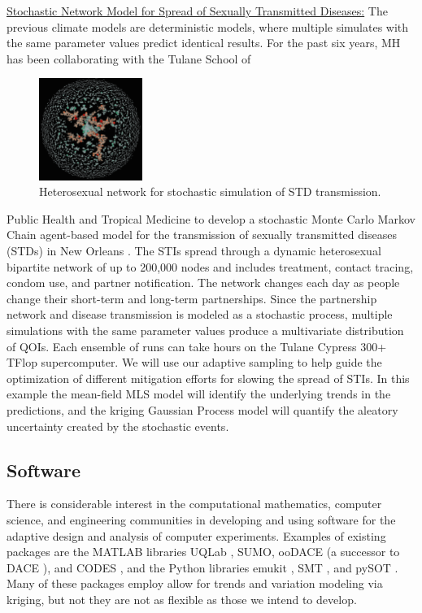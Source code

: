 \documentclass[11pt]{NSFamsart}
\begin{document}
\underline{Stochastic Network Model for Spread of Sexually Transmitted Diseases:}  The previous climate models are deterministic models, where multiple simulates with the same parameter values predict identical results. 
For the past six years, MH has been collaborating with the Tulane School of 
\begin{figure}
	  \begin{center}
	\includegraphics[width = 0.3\textwidth]{ProgramsImages/sexualNetworkNOLA}
	 \end{center}
	\caption{Heterosexual network for stochastic simulation of STD transmission.}
	\label{netmodel}
\end{figure}
Public Health and Tropical Medicine to develop a stochastic Monte Carlo Markov Chain agent-based model for the transmission of sexually transmitted diseases (STDs) in New Orleans \cite{azizi2018using}.  
The STIs spread through a dynamic heterosexual bipartite network of up to 200,000 nodes and includes treatment, contact tracing, condom use, and partner notification. The network changes each day as people change their short-term and long-term partnerships.  
Since the partnership network and disease transmission is modeled as a stochastic process, multiple simulations with the same parameter values produce a multivariate  distribution of QOIs.  Each ensemble of runs can take hours on the Tulane Cypress 300+ TFlop supercomputer. 
We will use our adaptive sampling to help guide the optimization of different mitigation efforts for slowing the spread of STIs.  
In this example the mean-field MLS model will identify the underlying trends in the predictions, and the kriging Gaussian Process model will quantify the aleatory uncertainty created by the stochastic events.


\subsection{Software}  \label{sec:Software}
There is considerable interest in the computational mathematics, computer science, and engineering communities in developing and using software for the adaptive design and analysis of computer experiments.  Examples of existing packages are the MATLAB libraries UQLab \cite{UQLab2014}, SUMO\cite{SUMO2010}, ooDACE \cite{ooDACE2014} (a successor to DACE \cite{dace2002}), and CODES \cite{CODES2015}, and the Python libraries emukit \cite{emukit2019}, SMT \cite{SMT2019}, and pySOT \cite{pySOT2015}.  Many of these packages employ allow for trends and variation modeling via kriging, but not they are not as flexible as those we intend to develop.
\end{document}
